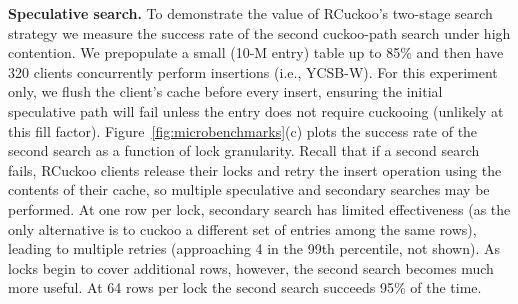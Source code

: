 \textbf{Speculative search.}
To demonstrate the value of RCuckoo's two-stage search strategy we
measure the success rate of the second cuckoo-path search under high
contention.  We prepopulate a small (10-M entry) table up to 85\% and
then have 320 clients concurrently perform insertions (i.e., YCSB-W).
For this experiment only, we flush the client's cache before every
insert, ensuring the initial speculative path will fail unless the entry does
not require cuckooing (unlikely at this fill factor).
Figure~\ref{fig:microbenchmarks}(c) plots the success rate of the
second search as a function of lock granularity.   Recall that if a second search
fails, RCuckoo clients release their locks and retry the insert
operation using the contents of their cache, so multiple speculative
and secondary searches may be performed.  At one row per lock,
secondary search has limited effectiveness (as the only alternative is
to cuckoo a different set of entries among the same rows), leading to
multiple retries (approaching 4 in the 99th percentile, not shown).
As locks begin to cover additional rows, however, the second search
becomes much more useful.
At 64 rows per lock the second search
succeeds 95\% of the time.




